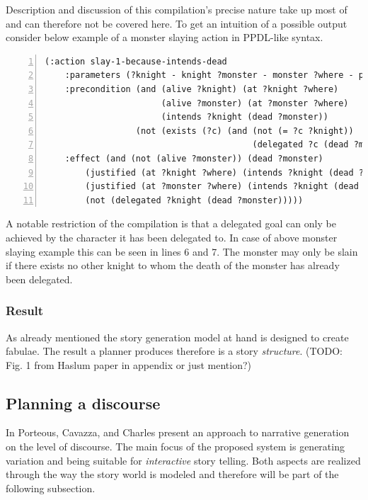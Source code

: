 Description and discussion of this compilation's precise nature take up most of \cite{Haslum14} and can therefore not be covered here. To get an intuition of a possible output consider below example of a monster slaying action in PPDL-like syntax.
\begin{lstlisting}[frame=single,basicstyle=\scriptsize,numbers=left,numberstyle=\tiny]
(:action slay-1-because-intends-dead
    :parameters (?knight - knight ?monster - monster ?where - place)
    :precondition (and (alive ?knight) (at ?knight ?where)
                       (alive ?monster) (at ?monster ?where)
                       (intends ?knight (dead ?monster))
                  (not (exists (?c) (and (not (= ?c ?knight))
                                         (delegated ?c (dead ?monster))))))
    :effect (and (not (alive ?monster)) (dead ?monster)
        (justified (at ?knight ?where) (intends ?knight (dead ?monster)))
        (justified (at ?monster ?where) (intends ?knight (dead ?monster)))
        (not (delegated ?knight (dead ?monster)))))
\end{lstlisting}
A notable restriction of the compilation is that a delegated goal can only be achieved by the character it has been delegated to. In case of above monster slaying example this can be seen in lines 6 and 7. The monster may only be slain if there exists no other knight to whom the death of the monster has already been delegated.
\subsubsection{Result}
As already mentioned the story generation model at hand is designed to create fabulae. The result a planner produces therefore is a story \emph{structure}. (TODO: Fig. 1 from Haslum paper in appendix or just mention?)

\subsection{Planning a discourse}\label{discourse}
In \cite{Porteous10} Porteous, Cavazza, and Charles present an approach to narrative generation on the level of discourse. The main focus of the proposed system is generating variation and being suitable for \emph{interactive} story telling. Both aspects are realized through the way the story world is modeled and therefore will be part of the following subsection.
